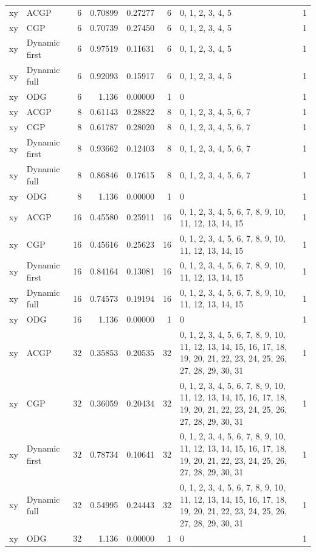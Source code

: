 \documentclass[10pt,a4paper]{article}
\begin{document}
\begin{longtable}{@{}p{23mm}p{29mm}rrrrp{36mm}r@{}}
xy & ACGP & 6 & 0.70899 & 0.27277 & 6 & 0, 1, 2, 3, 4, 5 & 1 \\
xy & CGP & 6 & 0.70739 & 0.27450 & 6 & 0, 1, 2, 3, 4, 5 & 1 \\
xy & Dynamic first & 6 & 0.97519 & 0.11631 & 6 & 0, 1, 2, 3, 4, 5 & 1 \\
xy & Dynamic full & 6 & 0.92093 & 0.15917 & 6 & 0, 1, 2, 3, 4, 5 & 1 \\
xy & ODG & 6 & 1.136 & 0.00000 & 1 & 0 & 1 \\
xy & ACGP & 8 & 0.61143 & 0.28822 & 8 & 0, 1, 2, 3, 4, 5, 6, 7 & 1 \\
xy & CGP & 8 & 0.61787 & 0.28020 & 8 & 0, 1, 2, 3, 4, 5, 6, 7 & 1 \\
xy & Dynamic first & 8 & 0.93662 & 0.12403 & 8 & 0, 1, 2, 3, 4, 5, 6, 7 & 1 \\
xy & Dynamic full & 8 & 0.86846 & 0.17615 & 8 & 0, 1, 2, 3, 4, 5, 6, 7 & 1 \\
xy & ODG & 8 & 1.136 & 0.00000 & 1 & 0 & 1 \\
xy & ACGP & 16 & 0.45580 & 0.25911 & 16 & 0, 1, 2, 3, 4, 5, 6, 7, 8, 9, 10, 11, 12, 13, 14, 15 & 1 \\
xy & CGP & 16 & 0.45616 & 0.25623 & 16 & 0, 1, 2, 3, 4, 5, 6, 7, 8, 9, 10, 11, 12, 13, 14, 15 & 1 \\
xy & Dynamic first & 16 & 0.84164 & 0.13081 & 16 & 0, 1, 2, 3, 4, 5, 6, 7, 8, 9, 10, 11, 12, 13, 14, 15 & 1 \\
xy & Dynamic full & 16 & 0.74573 & 0.19194 & 16 & 0, 1, 2, 3, 4, 5, 6, 7, 8, 9, 10, 11, 12, 13, 14, 15 & 1 \\
xy & ODG & 16 & 1.136 & 0.00000 & 1 & 0 & 1 \\
xy & ACGP & 32 & 0.35853 & 0.20535 & 32 & 0, 1, 2, 3, 4, 5, 6, 7, 8, 9, 10, 11, 12, 13, 14, 15, 16, 17, 18, 19, 20, 21, 22, 23, 24, 25, 26, 27, 28, 29, 30, 31 & 1 \\
xy & CGP & 32 & 0.36059 & 0.20434 & 32 & 0, 1, 2, 3, 4, 5, 6, 7, 8, 9, 10, 11, 12, 13, 14, 15, 16, 17, 18, 19, 20, 21, 22, 23, 24, 25, 26, 27, 28, 29, 30, 31 & 1 \\
xy & Dynamic first & 32 & 0.78734 & 0.10641 & 32 & 0, 1, 2, 3, 4, 5, 6, 7, 8, 9, 10, 11, 12, 13, 14, 15, 16, 17, 18, 19, 20, 21, 22, 23, 24, 25, 26, 27, 28, 29, 30, 31 & 1 \\
xy & Dynamic full & 32 & 0.54995 & 0.24443 & 32 & 0, 1, 2, 3, 4, 5, 6, 7, 8, 9, 10, 11, 12, 13, 14, 15, 16, 17, 18, 19, 20, 21, 22, 23, 24, 25, 26, 27, 28, 29, 30, 31 & 1 \\
xy & ODG & 32 & 1.136 & 0.00000 & 1 & 0 & 1 \\

\end{longtable}
\end{document}
